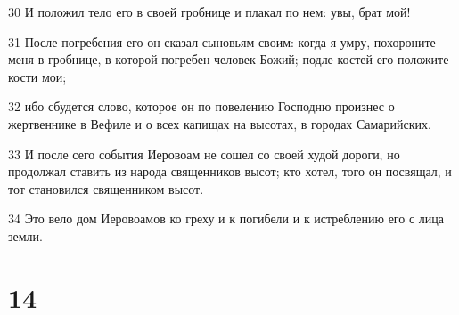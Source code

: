 \par 30 И положил тело его в своей гробнице и плакал по нем: увы, брат мой!
\par 31 После погребения его он сказал сыновьям своим: когда я умру, похороните меня в гробнице, в которой погребен человек Божий; подле костей его положите кости мои;
\par 32 ибо сбудется слово, которое он по повелению Господню произнес о жертвеннике в Вефиле и о всех капищах на высотах, в городах Самарийских.
\par 33 И после сего события Иеровоам не сошел со своей худой дороги, но продолжал ставить из народа священников высот; кто хотел, того он посвящал, и тот становился священником высот.
\par 34 Это вело дом Иеровоамов ко греху и к погибели и к истреблению его с лица земли.

\chapter{14}

